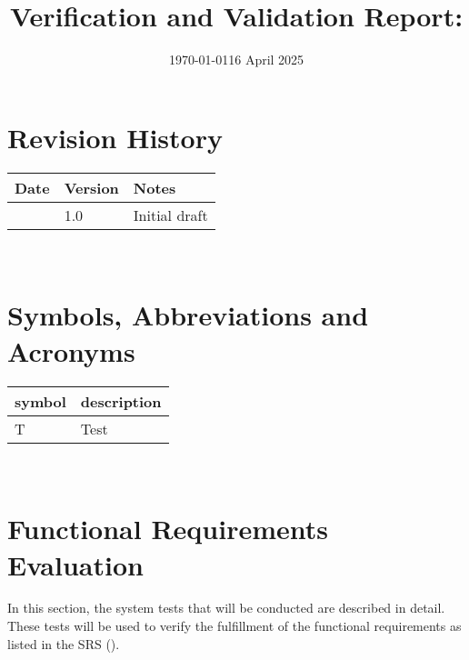 \documentclass[12pt, titlepage]{article}
\begin{document}
\title{Verification and Validation Report: \progname}
\author{\authname}
\date{\today}

\maketitle


\section{Revision History}

\begin{tabularx}{\textwidth}{p{3cm}p{2cm}X}
  \toprule {\bf Date}  & {\bf Version} & {\bf Notes}   \\
  \midrule
  \date{16 April 2025} & 1.0           & Initial draft \\
  \bottomrule
\end{tabularx}

~\newpage

\section{Symbols, Abbreviations and Acronyms}

\renewcommand{\arraystretch}{1.2}
\begin{tabular}{l l}
  \toprule
  \textbf{symbol} & \textbf{description}\\
  \midrule
  T & Test\\
  \bottomrule
\end{tabular}\\


\newpage

\tableofcontents

\listoftables %

\listoffigures %

\newpage


\section{Functional Requirements Evaluation}

In this section, the system tests that will be conducted are described in
detail. These tests will be used to verify the fulfillment of the functional
requirements as listed in the SRS (\cite{SRS}).
\end{document}
